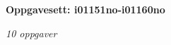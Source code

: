 \centerline{\bf Oppgavesett: i01151no-i01160no}
\vskip 10pt
\centerline{\it 10 oppgaver}\vskip 10pt
\vskip 10pt
